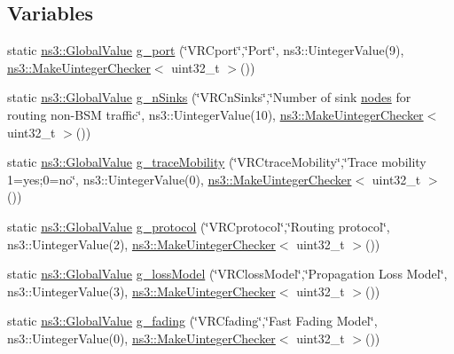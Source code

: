 \subsection*{Variables}
\begin{DoxyCompactItemize}
\item 
static \hyperlink{classns3_1_1GlobalValue}{ns3\+::\+Global\+Value} \hyperlink{vanet-routing-compare_8cc_a1262bf81a1689770102be686a0c48b41}{g\+\_\+port} (\char`\"{}V\+R\+Cport\char`\"{},\char`\"{}Port\char`\"{}, ns3\+::\+Uinteger\+Value(9), \hyperlink{namespacens3_aed274764da411ed9397a3524a7c9abb8}{ns3\+::\+Make\+Uinteger\+Checker}$<$ uint32\+\_\+t $>$())
\item 
static \hyperlink{classns3_1_1GlobalValue}{ns3\+::\+Global\+Value} \hyperlink{vanet-routing-compare_8cc_a32b22c3b554cf17e3b7e7da8e15c494d}{g\+\_\+n\+Sinks} (\char`\"{}V\+R\+Cn\+Sinks\char`\"{},\char`\"{}Number of sink \hyperlink{visualizer-ideas_8txt_a3e1b3808014a2c68ab0cd0182e041be2}{nodes} for routing non-\/B\+SM traffic\char`\"{}, ns3\+::\+Uinteger\+Value(10), \hyperlink{namespacens3_aed274764da411ed9397a3524a7c9abb8}{ns3\+::\+Make\+Uinteger\+Checker}$<$ uint32\+\_\+t $>$())
\item 
static \hyperlink{classns3_1_1GlobalValue}{ns3\+::\+Global\+Value} \hyperlink{vanet-routing-compare_8cc_aa579c762a1772e281a229e564f28200e}{g\+\_\+trace\+Mobility} (\char`\"{}V\+R\+Ctrace\+Mobility\char`\"{},\char`\"{}Trace mobility 1=yes;0=no\char`\"{}, ns3\+::\+Uinteger\+Value(0), \hyperlink{namespacens3_aed274764da411ed9397a3524a7c9abb8}{ns3\+::\+Make\+Uinteger\+Checker}$<$ uint32\+\_\+t $>$())
\item 
static \hyperlink{classns3_1_1GlobalValue}{ns3\+::\+Global\+Value} \hyperlink{vanet-routing-compare_8cc_af4c30a048d62562011e4f30ba31a4e19}{g\+\_\+protocol} (\char`\"{}V\+R\+Cprotocol\char`\"{},\char`\"{}Routing protocol\char`\"{}, ns3\+::\+Uinteger\+Value(2), \hyperlink{namespacens3_aed274764da411ed9397a3524a7c9abb8}{ns3\+::\+Make\+Uinteger\+Checker}$<$ uint32\+\_\+t $>$())
\item 
static \hyperlink{classns3_1_1GlobalValue}{ns3\+::\+Global\+Value} \hyperlink{vanet-routing-compare_8cc_ad1c8112c8732013db7b1949f56a4a82d}{g\+\_\+loss\+Model} (\char`\"{}V\+R\+Closs\+Model\char`\"{},\char`\"{}Propagation Loss Model\char`\"{}, ns3\+::\+Uinteger\+Value(3), \hyperlink{namespacens3_aed274764da411ed9397a3524a7c9abb8}{ns3\+::\+Make\+Uinteger\+Checker}$<$ uint32\+\_\+t $>$())
\item 
static \hyperlink{classns3_1_1GlobalValue}{ns3\+::\+Global\+Value} \hyperlink{vanet-routing-compare_8cc_a637f57292a68174c5c3916051172b921}{g\+\_\+fading} (\char`\"{}V\+R\+Cfading\char`\"{},\char`\"{}Fast Fading Model\char`\"{}, ns3\+::\+Uinteger\+Value(0), \hyperlink{namespacens3_aed274764da411ed9397a3524a7c9abb8}{ns3\+::\+Make\+Uinteger\+Checker}$<$ uint32\+\_\+t $>$())

\end{DoxyCompactItemize}
